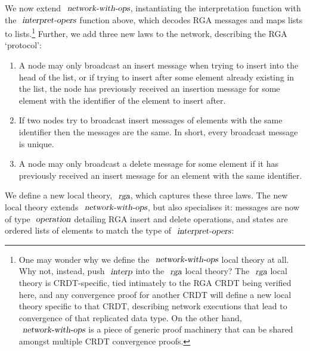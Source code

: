 \documentclass[acmlarge,review,anonymous]{acmart}\settopmatter{printfolios=true}
\begin{document}
We now extend $\isa{network-with-ops}$, instantiating the interpretation function with the $\isa{interpret-opers}$ function above, which decodes RGA messages and maps lists to lists.\footnote{One may wonder why we define the $\isa{network-with-ops}$ local theory at all.
Why not, instead, push $\isa{interp}$ into the $\isa{rga}$ local theory?
The $\isa{rga}$ local theory is CRDT-specific, tied intimately to the RGA CRDT being verified here, and any convergence proof for another CRDT will define a new local theory specific to that CRDT, describing network executions that lead to convergence of that replicated data type.
On the other hand, $\isa{network-with-ops}$ is a piece of generic proof machinery that can be shared amongst multiple CRDT convergence proofs.}
Further, we add three new laws to the network, describing the RGA `protocol':
\begin{enumerate}
\item
A node may only broadcast an insert message when trying to insert into the head of the list, or if trying to insert after some element already existing in the list, the node has previously received an insertion message for some element with the identifier of the element to insert after.
\item
If two nodes try to broadcast insert messages of elements with the same identifier then the messages are the same.
In short, every broadcast message is unique.
\item
A node may only broadcast a delete message for some element if it has previously received an insert message for an element with the same identifier.
\end{enumerate}
We define a new local theory, $\isa{rga}$, which captures these three laws.
The new local theory extends $\isa{network-with-ops}$, but also specialises it: messages are now of type $\isa{operation}$ detailing RGA insert and delete operations, and states are ordered lists of elements to match the type of $\isa{interpret-opers}$:
\\
\end{document}
